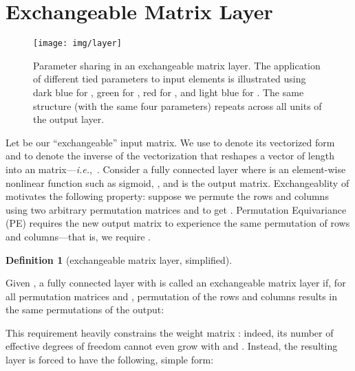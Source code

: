 \documentclass{article}
\newcommand{\ie}[0]{\emph{i.e.},~}
\theoremstyle{definition}
\newtheorem{definition}{Definition}[section]
\begin{document}
\section{Exchangeable Matrix Layer}\label{sec:layer}
\begin{figure}[t]\centering
\texttt{[image: img/layer]}
\vspace{-2em}\caption{Parameter sharing in an exchangeable matrix layer. The application of different tied parameters to input elements is illustrated using dark blue for , green for  , red for , and light blue for . The same structure (with the same four parameters) repeats across all units of the output layer. }
\label{fig:parameter_sharing}
\end{figure}



Let   be our ``exchangeable'' input matrix. We use  to denote its vectorized form and  to denote the inverse of the vectorization that reshapes a vector of length  into an  matrix---\ie .
Consider a fully connected layer  where  is an element-wise nonlinear function such as sigmoid, ,
and  is the output matrix. 
Exchangeablity of  motivates the following property:
suppose we permute the rows and columns 
using two arbitrary permutation matrices  and 
to get . Permutation Equivariance (PE) requires the new output matrix  to 
experience the same permutation of rows and columns---that is, we require .


\begin{definition}[exchangeable matrix layer, simplified\footnotemark]\label{def:2pe_layer}


Given , a fully connected layer 
 with  is called an {exchangeable matrix layer} if, for all permutation matrices  and , permutation of the rows and columns results in the same permutations of the output:
 
\end{definition}

This requirement heavily constrains the weight matrix : indeed, its number of effective degrees of freedom cannot even grow with  and . Instead, the resulting layer is forced to have the following, simple form:
\end{document}

